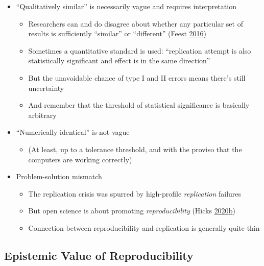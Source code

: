\documentclass[
]{article}
\providecommand{\tightlist}{%
  \setlength{\itemsep}{0pt}\setlength{\parskip}{0pt}}
\begin{document}
\begin{itemize}
\tightlist
\item
  ``Qualitatively similar'' is necessarily vague and requires interpretation

  \begin{itemize}
  \tightlist
  \item
    Researchers can and do disagree about whether any particular set of results is sufficiently ``similar'' or ``different'' (Feest \protect\hyperlink{ref-FeestExperimentersRegressReconsidered2016}{2016})
  \item
    Sometimes a quantitative standard is used: ``replication attempt is also statistically significant and effect is in the same direction''
  \item
    But the unavoidable chance of type I and II errors means there's still uncertainty
  \item
    And remember that the threshold of statistical significance is basically arbitrary
  \end{itemize}
\item
  ``Numerically identical'' is not vague

  \begin{itemize}
  \tightlist
  \item
    (At least, up to a tolerance threshold, and with the proviso that the computers are working correctly)
  \end{itemize}
\item
  Problem-solution mismatch

  \begin{itemize}
  \tightlist
  \item
    The replication crisis was spurred by high-profile \emph{replication} failures
  \item
    But open science is about promoting \emph{reproducibility} (Hicks \protect\hyperlink{ref-HicksCommentSubmittedDaniel2020}{2020}\protect\hyperlink{ref-HicksCommentSubmittedDaniel2020}{b})
  \item
    Connection between reproducibility and replication is generally quite thin
  \end{itemize}
\end{itemize}

\hypertarget{epistemic-value-of-reproducibility}{%
\subsection{Epistemic Value of Reproducibility}\label{epistemic-value-of-reproducibility}}
\end{document}
